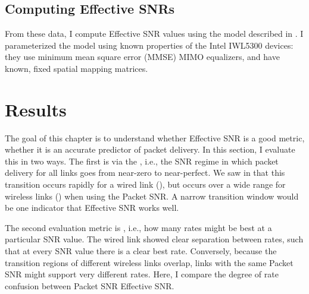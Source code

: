 \subsection{Computing Effective SNRs}
From these data, I compute Effective SNR values using the model described in . I parameterized the model using known properties of the Intel IWL5300 devices: they use minimum mean square error (MMSE) MIMO equalizers, and have known, fixed spatial mapping matrices.

\section{Results}
The goal of this chapter is to understand whether Effective SNR is a good metric, whether it is an accurate predictor of packet delivery. In this section, I evaluate this in two ways. The first is via the , i.e., the SNR regime in which packet delivery for all links goes from near-zero to near-perfect. We saw in  that this transition occurs rapidly for a wired link (), but occurs over a wide range for wireless links () when using the Packet SNR. A narrow transition window would be one indicator that Effective SNR works well.

The second evaluation metric is , i.e., how many rates might be best at a particular SNR value. The wired link showed clear separation between rates, such that at every SNR value there is a clear best rate. Conversely, because the transition regions of different wireless links overlap, links with the same Packet SNR might support very different rates. Here, I compare the degree of rate confusion between Packet SNR Effective SNR.

